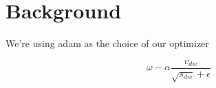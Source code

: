 \chapter{Background}
\label{chap:back}













We're using \acrfull{adam} as the choice of our optimizer

\begin{equation}
    \omega - \alpha \frac{v_{dw}}  {\sqrt{s_{dw}} + \epsilon}
\end{equation}